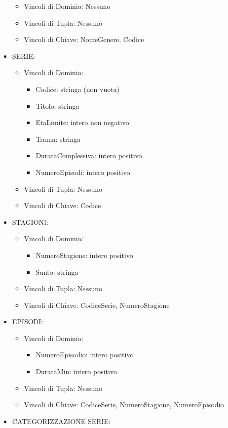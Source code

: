 \documentclass[a4paper,12pt]{report}
\begin{document}
\begin{itemize}
\begin{itemize}
		\item Vincoli di Dominio: Nessuno
		\item Vincoli di Tupla: Nessuno
		\item Vincoli di Chiave: NomeGenere, Codice
	\end{itemize}
	\item SERIE:
	\begin{itemize}
		\item Vincoli di Dominio:
		\begin{itemize}
			\item Codice: stringa (non vuota)
			\item Titolo: stringa
			\item EtaLimite: intero non negativo
			\item Trama: stringa
			\item DurataComplessiva: intero positivo
			\item NumeroEpisodi: intero positivo
		\end{itemize}
		\item Vincoli di Tupla: Nessuno
		\item Vincoli di Chiave: Codice
	\end{itemize}
	\item STAGIONI:
	\begin{itemize}
		\item Vincoli di Dominio:
		\begin{itemize}
			\item NumeroStagione: intero positivo
			\item Sunto: stringa
		\end{itemize}
		\item Vincoli di Tupla: Nessuno
		\item Vincoli di Chiave: CodiceSerie, NumeroStagione
	\end{itemize}
	\item EPISODI:
	\begin{itemize}
		\item Vincoli di Dominio:
		\begin{itemize}
			\item NumeroEpisodio: intero positivo
			\item DurataMin: intero positivo
		\end{itemize}
		\item Vincoli di Tupla: Nessuno
		\item Vincoli di Chiave: CodiceSerie, NumeroStagione, NumeroEpisodio
	\end{itemize}
	\item CATEGORIZZAZIONE SERIE:

\end{itemize}
\end{document}
